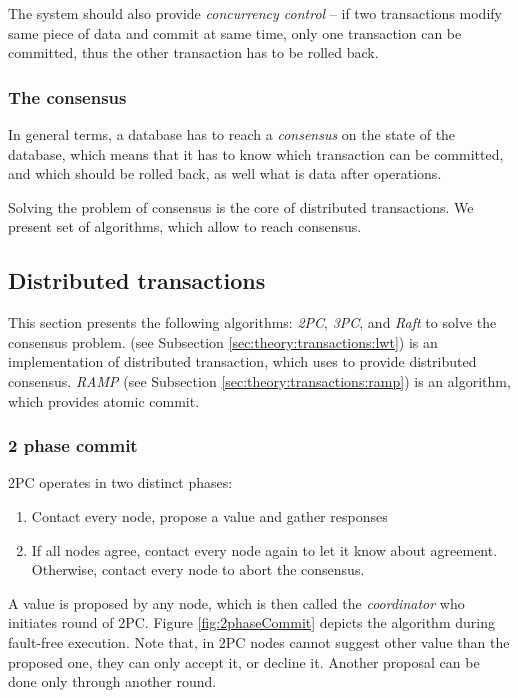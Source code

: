 The system should also provide \emph{concurrency control} -- if two transactions modify same piece of data and commit at same time, only one transaction can be committed, 
thus the other transaction has to be rolled back.


\subsubsection{The consensus}
In general terms, a database has to reach a \emph{consensus} on the state of the database, which means that it has to know which transaction can be committed, and which should be rolled back, as well what is data after operations.

Solving the problem of consensus is the core of distributed transactions. We present set of algorithms, which allow to reach consensus.

\subsection{Distributed transactions}


This section presents the following algorithms: \emph{2PC}, \emph{3PC}, \paxos and \emph{Raft} to solve the consensus problem. \lwt (see Subsection \ref{sec:theory:transactions:lwt}) is an implementation of distributed transaction, which uses \paxos to provide distributed consensus. \emph{RAMP} (see Subsection \ref{sec:theory:transactions:ramp}) is an algorithm, which provides atomic commit.

\subsubsection{2 phase commit}
2PC \cite{2phaseC}  operates in two distinct phases:
\begin{enumerate}
\item Contact every node, propose a value and gather responses
\item If all nodes agree, contact every node again to let it know about agreement. Otherwise, contact every node to abort the consensus.
\end{enumerate}

A value is proposed by any node, which is then called the \emph{coordinator} who initiates round of 2PC.
Figure \ref{fig:2phaseCommit} depicts the algorithm during fault-free execution. Note that, in 2PC nodes cannot suggest other value than the proposed one, they can only accept it, or decline it. Another proposal can be done only through another round.

